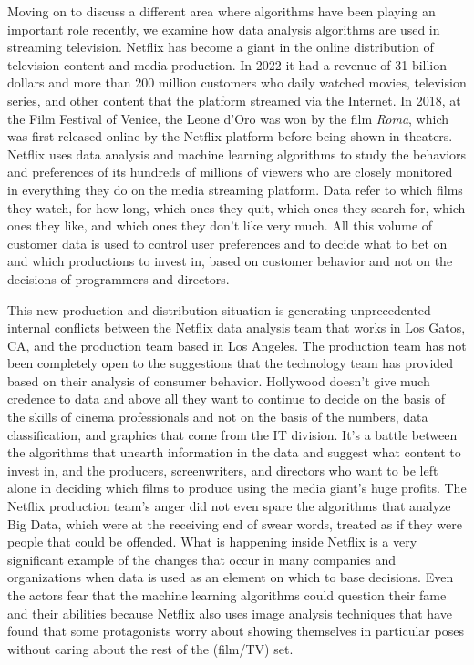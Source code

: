 Moving on to discuss a different area where algorithms have been playing an important role recently, we examine how data analysis algorithms are used in streaming television. Netflix has become a giant in the online distribution of television content and media production. In 2022 it had a revenue of 31 billion dollars and more than 200 million customers who daily watched movies, television series, and other content that the platform streamed via the Internet. In 2018, at the Film Festival of Venice, the Leone d'Oro was won by the film \textit{Roma}, which was first released online by the Netflix platform before being shown in theaters. Netflix uses data analysis and machine learning algorithms to study the behaviors and preferences of its hundreds of millions of viewers who are closely monitored in everything they do on the media streaming platform. Data refer to which films they watch, for how long, which ones they quit, which ones they search for, which ones they like, and which ones they don't like very much. All this volume of customer data is used to control user preferences and to decide what to bet on and which productions to invest in, based on customer behavior and not on the decisions of programmers and directors.

This new production and distribution situation is generating unprecedented internal conflicts between the Netflix data analysis team that works in Los Gatos, CA, and the production team based in Los Angeles. The production team has not been completely open to the suggestions that the technology team has provided based on their analysis of consumer behavior. Hollywood doesn't give much credence to data and above all they want to continue to decide on the basis of the skills of cinema professionals and not on the basis of the numbers, data classification, and graphics that come from the IT division. It's a battle between the algorithms that unearth information in the data and suggest what content to invest in, and the producers, screenwriters, and directors who want to be left alone in deciding which films to produce using the media giant's huge profits. The Netflix production team's anger did not even spare the algorithms that analyze Big Data, which were at the receiving end of swear words, treated as if they were people that could be offended. What is happening inside Netflix is a very significant example of the changes that occur in many companies and organizations when data is used as an element on which to base decisions. Even the actors fear that the machine learning algorithms could question their fame and their abilities because Netflix also uses image analysis techniques that have found that some protagonists worry about showing themselves in particular poses without caring about the rest of the (film/TV) set.

